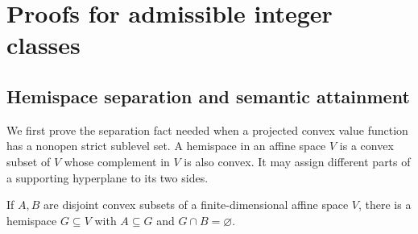 \section{Proofs for admissible integer classes}
\label{app:lattice}

\subsection{Hemispace separation and semantic attainment}
\label{app:lattice:semantic}

We first prove the separation fact needed when a projected convex value
function has a nonopen strict sublevel set. A hemispace in an affine space
$V$ is a convex subset of $V$ whose complement in $V$ is also convex. It
may assign different parts of a supporting hyperplane to its two sides.

\begin{lemma}
\label{lattice:hemispace}
If $A,B$ are disjoint convex subsets of a finite-dimensional affine space
$V$, there is a hemispace $G\subseteq V$ with $A\subseteq G$ and
$G\cap B=\varnothing$.
\end{lemma}

